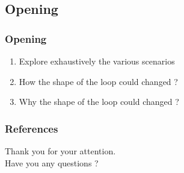 \documentclass{beamer}
\begin{document}
\subsection{Opening}
\begin{frame}
\frametitle{Opening}
\begin{enumerate}
    \item Explore exhaustively the various scenarios
    \item How the shape of the loop could changed ? %
    \item Why the shape of the loop could changed ? %
\end{enumerate}

\end{frame}




\begin{frame}
\frametitle{References}


\end{frame}


\begin{frame}

\begin{center}
Thank you for your attention.
\\
Have you any questions ?
\end{center}

\end{frame}
\end{document}
